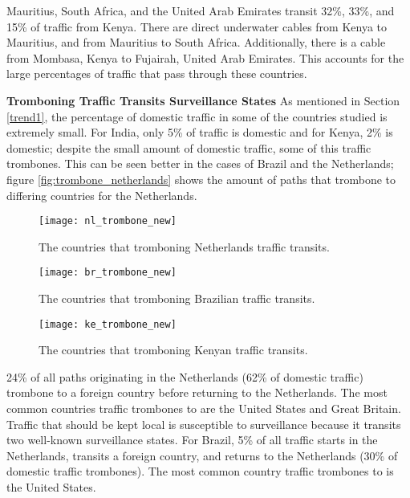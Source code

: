 Mauritius, South Africa, and the United Arab Emirates transit 32\%, 33\%, and 15\% of traffic from Kenya.  There are direct underwater cables from Kenya to Mauritius, and from Mauritius to South Africa.  Additionally, there is a cable from Mombasa, Kenya to Fujairah, United Arab Emirates.  This accounts for the large percentages of traffic that pass through these countries.

{\bf Tromboning Traffic Transits Surveillance States}
As mentioned in Section \ref{trend1}, the percentage of domestic traffic in some of the countries studied is extremely small.  For India, only 5\% of traffic is domestic and for Kenya, 2\% is domestic; despite the small amount of domestic traffic, some of this traffic trombones.  This can be seen better in the cases of Brazil and the Netherlands; figure \ref{fig:trombone_netherlands} shows the amount of paths that trombone to differing countries for the Netherlands.

\begin{figure*}[!htb]
  \texttt{[image: nl\_trombone\_new]}
  \caption{The countries that tromboning Netherlands traffic transits.}\label{fig:trombone_netherlands}
\endminipage\hfill
{}
  \texttt{[image: br\_trombone\_new]}
  \caption{The countries that tromboning Brazilian traffic transits.}\label{fig:trombone_brazil}
\endminipage\hfill
{}%
  \texttt{[image: ke\_trombone\_new]}
  \caption{The countries that tromboning Kenyan traffic transits.}\label{fig:trombone_kenya}
\endminipage
\end{figure*}


24\% of all paths originating in the Netherlands (62\% of domestic traffic) trombone to a foreign country before returning to the Netherlands. The most common countries traffic trombones to are the United States and Great Britain.  Traffic that should be kept local is susceptible to surveillance because it transits two well-known surveillance states.  For Brazil, 5\% of all traffic starts in the Netherlands, transits a foreign country, and returns to the Netherlands (30\% of domestic traffic trombones).  The most common country traffic trombones to is the United States. 

